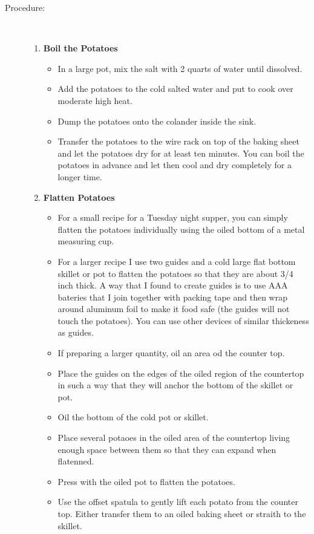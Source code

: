 \documentclass[11pt,letterpaper]{article}
\begin{document}
\begin{description}
\item[Procedure:]\ \\
	\begin{enumerate}
	\item {\bf Boil the Potatoes}
	\begin{itemize}
	\item In a large pot, mix the salt with 2 quarts of water until dissolved.
	\item Add the potatoes to the cold salted water and put to cook over moderate high heat.
	\item Dump the potatoes onto the colander inside the sink.
	\item Transfer the potatoes to the wire rack on top of the baking sheet and let the potatoes dry for at least ten minutes. You can boil the potatoes in advance and let then cool and dry completely for a longer time.
	\end{itemize}
	\item {\bf Flatten Potatoes}
	\begin{itemize}
          \item For a small recipe for a Tuesday night supper, you can simply flatten the potatoes individually using the oiled bottom of a metal measuring cup.
	\item For a larger recipe I use two guides and a cold large flat bottom skillet or pot to flatten the potatoes so that they are about 3/4 inch thick. A way that I found to create guides is to use AAA bateries that I join together with packing tape and then wrap around aluminum foil to make it food safe (the guides will not touch the potatoes). You can use other devices of similar thickeness as guides. 
	\item If preparing a larger quantity, oil an area od the counter top.
        \item Place the guides on the edges of the oiled region of the countertop in such a way that they will anchor the bottom of the skillet or pot.
        \item Oil the bottom of the cold pot or skillet.
        \item Place several potaoes in the oiled area of the countertop living enough space between them so that they can expand when flatenned.
        \item Press with the oiled pot to flatten the potatoes.
        \item Use the offset spatula to gently lift each potato from the counter top. Either transfer them to an oiled baking sheet or straith to the skillet. 

\end{itemize}
\end{enumerate}
\end{description}
\end{document}
